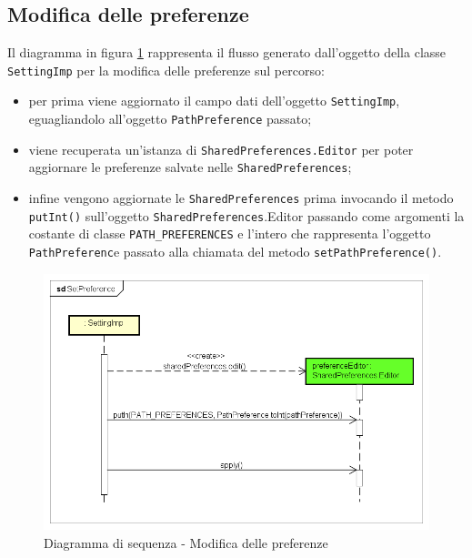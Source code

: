 \documentclass[../DefinizioneDiProdotto.tex]{subfiles}
\begin{document}
	\newpage
	\subsection{Modifica delle preferenze}
	
		Il diagramma in figura \ref{SetPreference} rappresenta il flusso generato dall'oggetto della classe \verb|SettingImp| per la modifica delle preferenze sul percorso:
		\begin{itemize}
			\item per prima viene aggiornato il campo dati dell'oggetto \verb|SettingImp|, eguagliandolo all'oggetto \verb|PathPreference| passato;
			\item viene recuperata un'istanza di \verb|SharedPreferences.Editor| per poter aggiornare le preferenze salvate nelle \verb|SharedPreferences|;
			\item infine vengono aggiornate le \verb|SharedPreferences| prima invocando il metodo \verb|putInt()| sull'oggetto \verb|SharedPreferences|.Editor passando come argomenti la costante di classe \verb|PATH_PREFERENCES| e l'intero che rappresenta l'oggetto \verb|PathPreferenc|e passato alla chiamata del metodo \verb|setPathPreference()|.
		\end{itemize}
		
		\begin{figure} [h]
			\includegraphics[width=\textwidth]{diagrams/SetPreference}
			\caption{Diagramma di sequenza - Modifica delle preferenze}
			\label{SetPreference}
		\end{figure}
		
		
\end{document}
